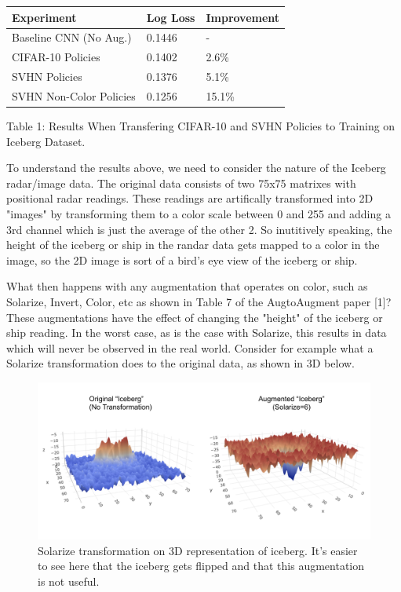 \documentclass[10pt,twocolumn,letterpaper]{article}
\begin{document}
    \begin{table}[h]
      \begin{tabular}{lll}
        \hline
        Experiment &Log Loss & Improvement   \\ \hline
        Baseline CNN (No Aug.)  &0.1446 &-\\
        CIFAR-10 Policies &0.1402  & 2.6\%\\ 
        SVHN Policies &0.1376  & 5.1\%\\
        SVHN Non-Color Policies &0.1256  &15.1\%\\  
        \hline
      \end{tabular}
    \end{table}

Table 1: Results When Transfering CIFAR-10 and SVHN Policies to Training on Iceberg Dataset.

To understand the results above, we need to consider the nature of the Iceberg radar/image data.  The original data consists of two 75x75 matrixes with positional radar readings.  These readings are artifically transformed into 2D "images" by transforming them to a color scale between 0 and 255 and adding a 3rd channel which is just the average of the other 2.  So inutitively speaking, the height of the iceberg or ship in the randar data gets mapped to a color in the image, so the 2D image is sort of a bird's eye view of the iceberg or ship.

What then happens with any augmentation that operates on color, such as Solarize, Invert, Color, etc as shown in Table 7 of the AugtoAugment paper [1]?  These augmentations have the effect of changing the "height" of the iceberg or ship reading.  In the worst case, as is the case with Solarize, this results in data which will never be observed in the real world.  Consider for example what a Solarize transformation does to the original data, as shown in 3D below.


\begin{figure}[bhp]
\includegraphics[width=\columnwidth]{iceberg_solarize.png}
\caption{Solarize transformation on 3D representation of iceberg.  It's easier to see here that the iceberg gets flipped and that this augmentation is not useful.}
\end{figure}
\end{document}
